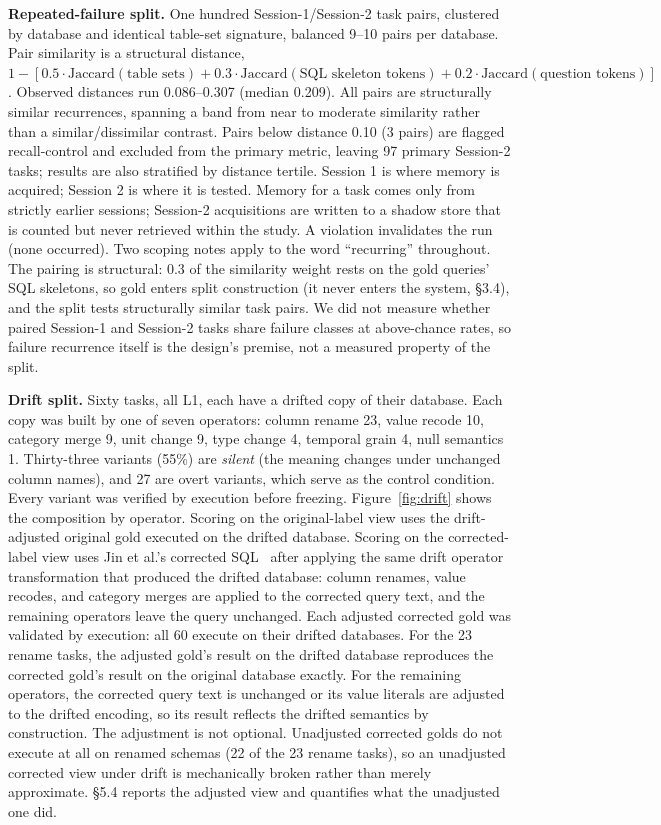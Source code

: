 \documentclass[sigconf, nonacm]{acmart}
\begin{document}
\textbf{Repeated-failure split.} One hundred Session-1/Session-2 task pairs, clustered by database and identical table-set signature, balanced 9--10 pairs per database. Pair similarity is a structural distance, $1 - [0.5 \cdot \mathrm{Jaccard}(\text{table sets}) + 0.3 \cdot \mathrm{Jaccard}(\text{SQL skeleton tokens}) + 0.2 \cdot \mathrm{Jaccard}(\text{question tokens})]$. Observed distances run 0.086--0.307 (median 0.209). All pairs are structurally similar recurrences, spanning a band from near to moderate similarity rather than a similar/dissimilar contrast. Pairs below distance 0.10 (3 pairs) are flagged recall-control and excluded from the primary metric, leaving 97 primary Session-2 tasks; results are also stratified by distance tertile. Session 1 is where memory is acquired; Session 2 is where it is tested. Memory for a task comes only from strictly earlier sessions; Session-2 acquisitions are written to a shadow store that is counted but never retrieved within the study. A violation invalidates the run (none occurred). Two scoping notes apply to the word ``recurring'' throughout. The pairing is structural: 0.3 of the similarity weight rests on the gold queries' SQL skeletons, so gold enters split construction (it never enters the system, \S3.4), and the split tests structurally similar task pairs. We did not measure whether paired Session-1 and Session-2 tasks share failure classes at above-chance rates, so failure recurrence itself is the design's premise, not a measured property of the split.

\textbf{Drift split.} Sixty tasks, all L1, each have a drifted copy of their database. Each copy was built by one of seven operators: column rename 23, value recode 10, category merge 9, unit change 9, type change 4, temporal grain 4, null semantics 1. Thirty-three variants (55\%) are \emph{silent} (the meaning changes under unchanged column names), and 27 are overt variants, which serve as the control condition. Every variant was verified by execution before freezing. Figure~\ref{fig:drift} shows the composition by operator. Scoring on the original-label view uses the drift-adjusted original gold executed on the drifted database. Scoring on the corrected-label view uses Jin et al.'s corrected SQL~\cite{jin} after applying the same drift operator transformation that produced the drifted database: column renames, value recodes, and category merges are applied to the corrected query text, and the remaining operators leave the query unchanged. Each adjusted corrected gold was validated by execution: all 60 execute on their drifted databases. For the 23 rename tasks, the adjusted gold's result on the drifted database reproduces the corrected gold's result on the original database exactly. For the remaining operators, the corrected query text is unchanged or its value literals are adjusted to the drifted encoding, so its result reflects the drifted semantics by construction. The adjustment is not optional. Unadjusted corrected golds do not execute at all on renamed schemas (22 of the 23 rename tasks), so an unadjusted corrected view under drift is mechanically broken rather than merely approximate. \S5.4 reports the adjusted view and quantifies what the unadjusted one did.
\end{document}
